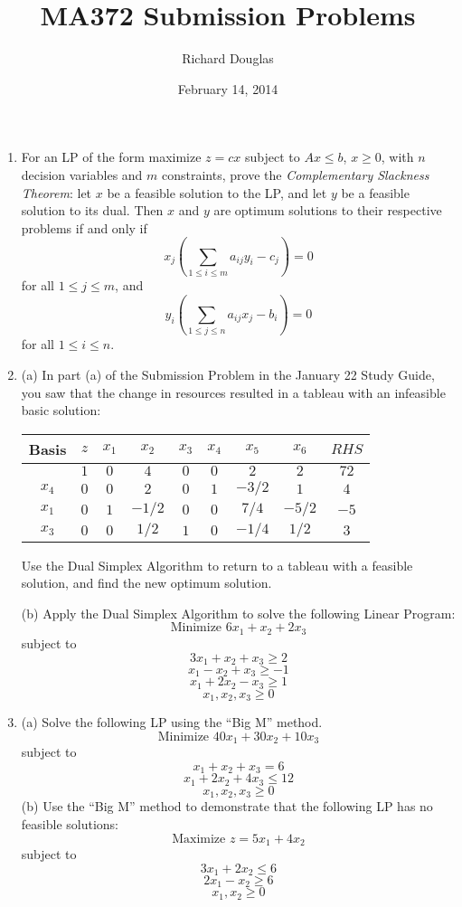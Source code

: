 \documentclass{article}[12pt,a4paper]
\title{MA372 Submission Problems}
\author{Richard Douglas}
\date{February 14,  2014}
\begin{document}
  \maketitle
  \begin{enumerate}
  \item For an LP of the form maximize $z = cx$ subject to $Ax \le b$, $x \ge 0$, with $n$ decision variables
  and $m$ constraints, prove the \textit{Complementary Slackness Theorem}: let $x$ be a feasible solution
  to the LP, and let $y$ be a feasible solution to its dual. Then $x$ and $y$ are optimum solutions to their 
  respective problems if and only if
  $$x_j(\sum_{1 \le i \le m}{a_{ij}y_i - c_j}) = 0$$
  for all $1 \le j \le m$, and
  $$y_i(\sum_{1 \le j \le n}{a_{ij}x_j - b_i}) = 0$$ 
  for all $1 \le i \le n$.
  \newline
  \item 
  (a) In part (a) of the Submission Problem in the January 22 Study Guide, you saw that the change in resources
  resulted in a tableau with an infeasible basic solution:
  \begin{center}
  \begin{tabular}{c | c | c c c c c c | c}
  Basis & $z$ & $x_1$ & $x_2$ & $x_3$ & $x_4$ & $x_5$ & $x_6$ & $RHS$ \\ \hline
           & $1$ & $0$ & $4$ & $0$ & $0$ & $2$ & $2$ & $72$ \\ \hline
  $x_4$ & $0$ & $0$ & $2$ & $0$ & $1$ & $-3/2$ & $1$ & $4$ \\
  $x_1$ & $0$ & $1$ & $-1/2$ & $0$ & $0$ & $7/4$ & $-5/2$ & $-5$ \\
  $x_3$ & $0$ & $0$ & $1/2$ & $1$ & $0$ & $-1/4$ & $1/2$ & $3$
  \end{tabular}
  \end{center}
   Use the Dual Simplex Algorithm to return to a tableau with a feasible solution, and find the new optimum solution. \newline
  
  (b) Apply the Dual Simplex Algorithm to solve the following Linear Program:
  $$\mbox{Minimize } 6x_1 + x_2 + 2x_3$$
  subject to
  $$3x_1 + x_2 + x_3 \ge 2$$
  $$x_1 - x_2 + x_3 \ge -1$$
  $$x_1 + 2x_2 - x_3 \ge 1$$
  $$x_1, x_2, x_3 \ge 0$$
  \pagebreak
  
  \item
  (a) Solve the following LP using the ``Big M'' method.
  $$\mbox{Minimize } 40x_1 + 30x_2 + 10x_3$$
  subject to
  $$x_1 + x_2 + x_3 = 6$$
  $$x_1 + 2x_2 + 4x_3 \le 12$$
  $$x_1, x_2, x_3 \ge 0$$ \newline
  (b) Use the ``Big M'' method to demonstrate that the following LP has no feasible solutions:
  $$\mbox{Maximize } z = 5x_1 + 4x_2$$
  subject to
  $$3x_1 + 2x_2 \le 6$$
  $$2x_1 - x_2 \ge 6$$
  $$x_1, x_2 \ge 0$$ \newline
  \end{enumerate}
\end{document}
